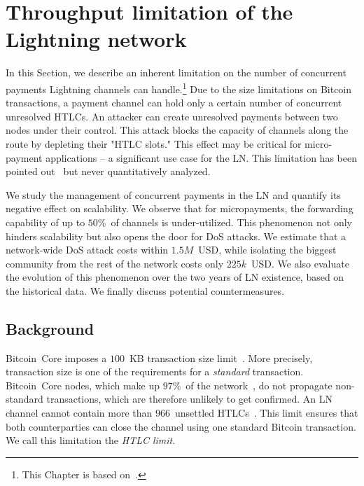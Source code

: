 \chapter{Throughput limitation of the Lightning network}

\label{Chapter08HTLClimit}

In this Section, we describe an inherent limitation on the number of concurrent payments Lightning channels can handle.\footnote{This Chapter is based on~\cite{Tikhomirov2020a}.}
Due to the size limitations on Bitcoin transactions, a payment channel can hold only a certain number of concurrent unresolved HTLCs.
An attacker can create unresolved payments between two nodes under their control.
This attack blocks the capacity of channels along the route by depleting their "HTLC slots."
This effect may be critical for micro-payment applications -- a significant use case for the LN.
This limitation has been pointed out~\cite{EmelyanenkoK2017} but never quantitatively analyzed.

We study the management of concurrent payments in the LN and quantify its negative effect on scalability.
We observe that for micropayments, the forwarding capability of up to $50\%$~of channels is under-utilized.
This phenomenon not only hinders scalability but also opens the door for DoS attacks.
We estimate that a network-wide DoS attack costs within $1.5M$~USD, while isolating the biggest community from the rest of the network costs only $225k$~USD\@.
We also evaluate the evolution of this phenomenon over the two years of LN existence, based on the historical data.
We finally discuss potential countermeasures.


\section{Background} \label{max-htlc-background}

Bitcoin~Core imposes a $100$~KB transaction size limit~\cite{StandardTxBitcoinSE, BitcoinCoreMaxTxWeight}.
More precisely, transaction size is one of the requirements for a \textit{standard} transaction.
Bitcoin~Core nodes, which make up $97\%$~of the network~\cite{CoinDance}, do not propagate non-standard transactions, which are therefore unlikely to get confirmed.
An LN channel cannot contain more than $966$~unsettled HTLCs~\cite{BOLT2Rationale}.
This limit ensures that both counterparties can close the channel using one standard Bitcoin transaction.
We call this limitation the \textit{HTLC limit}.

